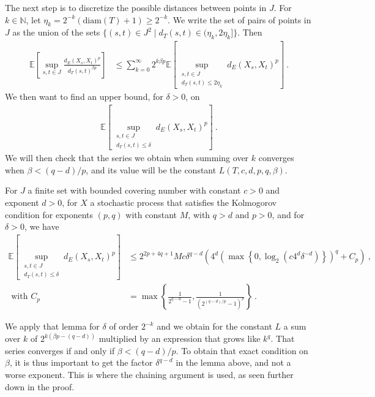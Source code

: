 \documentclass[lean]{Draft}
\makeatletter
\newcommand\leanlink{\begingroup\catcode`\#=12\relax\@leanlink}
\newcommand\@leanlink[2]{\endgroup
\href{#1}
{\texttt{\detokenize{#2}}}}
\newcommand{\docs}[1]{%
\leanlink{https://leanprover-community.github.io/mathlib4_docs/find/?pattern=#1\#doc}
{#1}}
\makeatother
\begin{document}
The next step is to discretize the possible distances between points in $J$.
For $k \in \mathbb{N}$, let $\eta_k = 2^{-k}(\mathrm{diam}(T) + 1) \ge 2^{-k}$.
We write the set of pairs of points in $J$ as the union of the sets $\{(s, t) \in J^2 \mid d_T(s, t) \in (\eta_k, 2\eta_k]\}$.
Then
\begin{align*}
  \mathbb{E}\left[ \sup_{s, t \in J} \frac{d_E(X_s, X_t)^p}{d_T(s, t)^{\beta p}} \right]
  &\le \sum_{k=0}^\infty 2^{k \beta p} \mathbb{E}\left[ \sup_{\substack{s, t \in J \\ d_T(s, t) \le 2\eta_k}} d_E(X_s, X_t)^p \right]
  \: .
\end{align*}
We then want to find an upper bound, for $\delta > 0$, on
\begin{align*}
  \mathbb{E}\left[ \sup_{\substack{s, t \in J \\ d_T(s, t) \le \delta}} d_E(X_s, X_t)^p \right]
  \: .
\end{align*}
We will then check that the series we obtain when summing over $k$ converges when $\beta < (q - d)/p$, and its value will be the constant $L(T, c, d, p, q, \beta)$.

\begin{lemma}[\docs{ProbabilityTheory.finite_set_bound_of_edist_le}]\label{lem:finite_set_bound_of_dist_le}
For $J$ a finite set with bounded covering number with constant $c > 0$ and exponent $d > 0$, for $X$ a stochastic process that satisfies the Kolmogorov condition for exponents $(p, q)$ with constant $M$, with $q > d$ and $p > 0$, and for $\delta > 0$, we have
\begin{align*}
  \mathbb{E}\left[ \sup_{\substack{s, t \in J \\ d_T(s, t) \le \delta}} d_E(X_s, X_t)^p \right]
  &\le 2^{2p+4q+1} M c \delta^{q-d}\left( 4^d \left(\max\left\{0, \log_2 \left(c 4^d \delta^{-d}\right)\right\}\right)^q + C_p \right)
  \: ,
  \\
  \text{ with } C_p
  &= \max\left\{\frac{1}{2^{q-d} - 1}, \frac{1}{(2^{(q-d)/p} - 1)^p}\right\}
  \: .
\end{align*}
\end{lemma}

We apply that lemma for $\delta$ of order $2^{-k}$ and we obtain for the constant $L$ a sum over $k$ of $2^{k(\beta p - (q - d))}$ multiplied by an expression that grows like $k^q$.
That series converges if and only if $\beta < (q - d)/p$.
To obtain that exact condition on $\beta$, it is thus important to get the factor $\delta^{q-d}$ in the lemma above, and not a worse exponent.
This is where the chaining argument is used, as seen further down in the proof.
\end{document}
